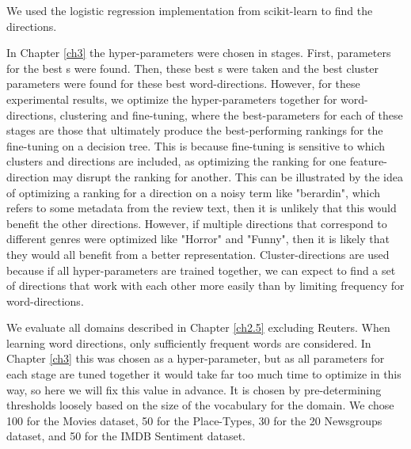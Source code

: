 We used the logistic regression implementation from scikit-learn to find the directions. 


In Chapter \ref{ch3} the hyper-parameters were chosen in stages. First, parameters for the best s were found. Then, these best s were taken and the best cluster parameters were found for these  best word-directions. However, for these experimental results, we optimize the hyper-parameters together for word-directions, clustering and fine-tuning, where the best-parameters for each of these stages are those that ultimately produce the best-performing rankings for the fine-tuning on a decision tree.  This is because fine-tuning is sensitive to which clusters and directions are included, as optimizing the ranking for one feature-direction may disrupt the ranking for another. This can be illustrated by the idea of optimizing a ranking for a direction on a noisy term like "berardin", which refers to some metadata from the review text, then it is unlikely that this would benefit the other directions. However, if multiple directions that correspond to different genres were optimized like "Horror" and "Funny", then it is likely that they would all benefit from a better representation. Cluster-directions are used because if all hyper-parameters are trained together, we can expect to find a set of directions that work with each other more easily than by limiting frequency for word-directions. 

We evaluate  all domains described in Chapter \ref{ch2.5} excluding Reuters. When learning word directions, only sufficiently frequent words are considered. In Chapter \ref{ch3} this was chosen as a hyper-parameter, but as all parameters for each stage are tuned together it would take far too much time to optimize in this way, so here we will fix this value in advance. It is chosen by pre-determining thresholds loosely based on the size of the vocabulary for the domain. We chose 100 for the Movies dataset,  50 for the Place-Types, 30 for the 20 Newsgroups dataset, and 50 for the IMDB Sentiment dataset. 

